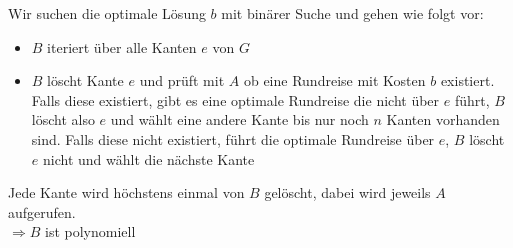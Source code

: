\documentclass{article}
\begin{document}
Wir suchen die optimale Lösung $b$ mit binärer Suche und gehen wie folgt vor:
\begin{itemize}
\item $B$ iteriert über alle Kanten $e$ von $G$ 
\item $B$ löscht Kante $e$ und prüft mit $A$ ob eine Rundreise mit Kosten $b$ existiert. Falls diese existiert, gibt es eine optimale Rundreise die nicht über $e$ führt, $B$ löscht also $e$ und wählt eine andere Kante bis nur noch $n$ Kanten vorhanden sind. Falls diese nicht existiert, führt die optimale Rundreise über $e$, $B$ löscht $e$ nicht und wählt die nächste Kante
\end{itemize}


Jede Kante wird höchstens einmal von $B$ gelöscht, dabei wird jeweils $A$ aufgerufen.\\
$\Rightarrow B$ ist polynomiell 
\end{document}
